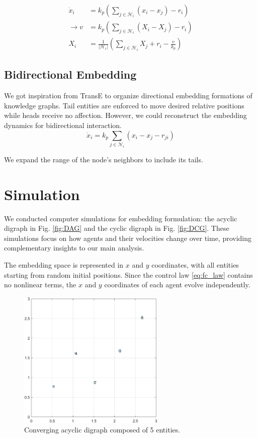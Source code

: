 \documentclass[letterpaper, 10 pt, conference]{ieeeconf}  %
\begin{document}
\begin{equation}
\begin{split}
\dot{x}_i &= k_p(\sum_{j \in \mathcal{H}_i} (x_i - x_j) -r_i) \\
\rightarrow v &= k_p(\sum_{j \in \mathcal{H}_i} (X_i - X_j) - r_i) \\
X_i &= \frac{1}{|\mathcal{H}_i|}(\sum_{j \in \mathcal{H}_i} X_j +r_i-\frac{v}{k_p})
\end{split}
\end{equation}

\subsection{Bidirectional Embedding}
We got inspiration from TransE to organize directional embedding formations of knowledge graphs. Tail entities are enforced to move desired relative positions while heads receive no affection. However, we could 
reconstruct the embedding dynamics for bidirectional interaction. 
\begin{equation}
    \dot{x}_i = k_p \sum_{j \in \mathcal{N}_i} (x_i - x_j - r_{ji})
\end{equation}

We expand the range of the node's neighbors to include its tails. 

\section{Simulation}
We conducted computer simulations for embedding formulation: the acyclic digraph in Fig. \ref{fig:DAG} and the cyclic digraph in Fig. \ref{fig:DCG}. These simulations focus on how agents and their velocities change over time, providing complementary insights to our main analysis.

The embedding space is represented in $x$ and $y$ coordinates, with all entities starting from random initial positions. Since the control law \eqref{eq:fc_law} contains no nonlinear terms, the $x$ and $y$ coordinates of each agent evolve independently. %

\begin{figure}[thb]
\begin{center}
\includegraphics[width=7cm]{IMG/AG_simul3.png}
\caption{Converging acyclic digraph composed of 5 entities.}
\label{fig:DAGstate}
\end{center}
\vspace{-3mm}
\end{figure}
\end{document}
